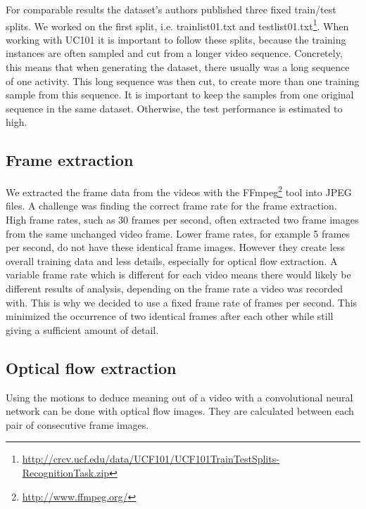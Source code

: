 For comparable results the dataset's authors published three fixed train/test splits.
We worked on the first split, i.e. trainlist01.txt and testlist01.txt\footnote{\url{http://crcv.ucf.edu/data/UCF101/UCF101TrainTestSplits-RecognitionTask.zip}}. %
When working with UC101 it is important to follow these splits, because the training instances are often sampled and cut from a longer video sequence.
Concretely, this means that when generating the dataset, there usually was a long sequence of one activity.
This long sequence was then cut, to create more than one training sample from this sequence.
It is important to keep the samples from one original sequence in the same dataset.
Otherwise, the test performance is estimated to high.


\subsection{Frame extraction}
We extracted the frame data from the videos with the FFmpeg\footnote{\url{http://www.ffmpeg.org/}} tool into JPEG files.
A challenge was finding the correct frame rate for the frame extraction.
High frame rates, such as 30 frames per second, often extracted two frame images from the same unchanged video frame.
Lower frame rates, for example 5 frames per second, do not have these identical frame images.
However they create less overall training data and less details, especially for optical flow extraction.
A variable frame rate which is different for each video means there would likely be different results of analysis, depending on the frame rate a video was recorded with.
This is why we decided to use a fixed frame rate of  frames per second.
This minimized the occurrence of two identical frames after each other while still giving a sufficient amount of detail.

\subsection{Optical flow extraction}
Using the motions to deduce meaning out of a video with a convolutional neural network can be done with optical flow images.
They are calculated between each pair of consecutive frame images.

